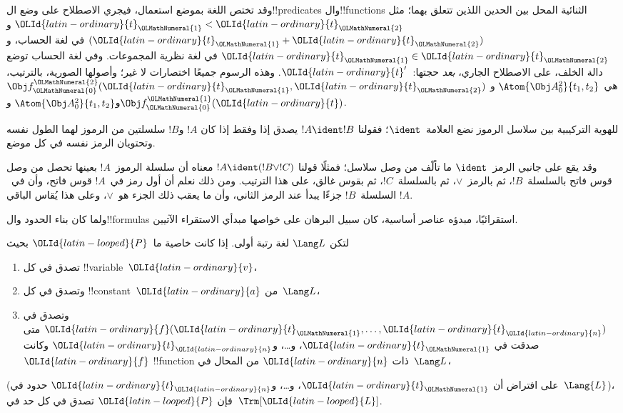 \documentclass[../../../include/open-logic-section]{subfiles}
\begin{document}
وقد تختص اللغة بموضع استعمال، فيجري الاصطلاح على وضع ال!!{predicate}s
وال!!{function}s الثنائية المحل بين الحدين اللذين تتعلق بهما؛ مثل
${\OLId{latin-ordinary}{t}}_{\OLMathNumeral{1}} < {\OLId{latin-ordinary}{t}}_{\OLMathNumeral{2}}$ و$({\OLId{latin-ordinary}{t}}_{\OLMathNumeral{1}} + {\OLId{latin-ordinary}{t}}_{\OLMathNumeral{2}})$ في لغة الحساب، و${\OLId{latin-ordinary}{t}}_{\OLMathNumeral{1}} \in {\OLId{latin-ordinary}{t}}_{\OLMathNumeral{2}}$ في لغة
نظرية المجموعات. وفي لغة الحساب توضع دالة الخلف، على الاصطلاح الجاري،
\emph{بعد} حجتها:~${\OLId{latin-ordinary}{t}}'$. وهذه الرسوم جميعًا اختصارات لا غير؛ وأصولها
الصورية، بالترتيب، هي~$\Atom{\Obj A^2_0}{t_1, t_2}$ و
$\Obj f^{\OLMathNumeral{2}}_{\OLMathNumeral{0}}({\OLId{latin-ordinary}{t}}_{\OLMathNumeral{1}}, {\OLId{latin-ordinary}{t}}_{\OLMathNumeral{2}})$ و$\Atom{\Obj A^2_0}{t_1, t_2}$ و$\Obj f^{\OLMathNumeral{1}}_{\OLMathNumeral{0}}({\OLId{latin-ordinary}{t}})$.

\begin{defn}
للهوية التركيبية بين سلاسل الرموز نضع العلامة~$\ident$؛ فقولنا
$!A \ident !B$ يصدق إذا وفقط إذا كان $!A$ و$!B$ سلسلتين من الرموز لهما
الطول نفسه وتحتويان الرمز نفسه في كل موضع.
\end{defn}

وقد يقع على جانبي الرمز~$\ident$ ما تألّف من وصل سلاسل؛ فمثلًا قولنا
$!A \ident (!B \lor !C)$ معناه أن سلسلة الرموز~$!A$ بعينها تحصل من
وصل قوس فاتح بالسلسلة~$!B$، ثم بالرمز~$\lor$، ثم بالسلسلة~$!C$، ثم
بقوس غالق، على هذا الترتيب. ومن ذلك نعلم أن أول رمز في~$!A$
قوس فاتح، وأن في~$!A$ السلسلة~$!B$ جزءًا يبدأ عند الرمز الثاني،
وأن ما يعقب ذلك الجزء هو~$\lor$، وعلى هذا يُقاس الباقي.

ولما كان بناء الحدود وال!!{formula}s استقرائيًا، مبدؤه عناصر أساسية،
كان سبيل البرهان على خواصها مبدأي الاستقراء الآتيين.

\begin{lem}
    لتكن $\Lang L$ لغة رتبة أولى.
    إذا كانت خاصية ما~${\OLId{latin-looped}{P}}$ بحيث
    \begin{enumerate}
        \item تصدق في كل !!{variable}~${\OLId{latin-ordinary}{v}}$،
        \item وتصدق في كل !!{constant}~${\OLId{latin-ordinary}{a}}$ من~$\Lang L$،
        \item وتصدق في ${\OLId{latin-ordinary}{f}}({\OLId{latin-ordinary}{t}}_{\OLMathNumeral{1}},\dotsc,{\OLId{latin-ordinary}{t}}_{\OLId{latin-ordinary}{n}})$ متى صدقت في
        ${\OLId{latin-ordinary}{t}}_{\OLMathNumeral{1}}$، و\dots، و${\OLId{latin-ordinary}{t}}_{\OLId{latin-ordinary}{n}}$ وكانت ${\OLId{latin-ordinary}{f}}$ !!{function} ذات ${\OLId{latin-ordinary}{n}}$ من
            المحال في~$\Lang L$،
    \end{enumerate}
    (على افتراض أن ${\OLId{latin-ordinary}{t}}_{\OLMathNumeral{1}}$، و\dots، و${\OLId{latin-ordinary}{t}}_{\OLId{latin-ordinary}{n}}$ حدود في~$\Lang{L}$)،
    فإن ${\OLId{latin-looped}{P}}$ تصدق في كل حد في~$\Trm[{\OLId{latin-looped}{L}}]$.
\end{lem}
\end{document}
